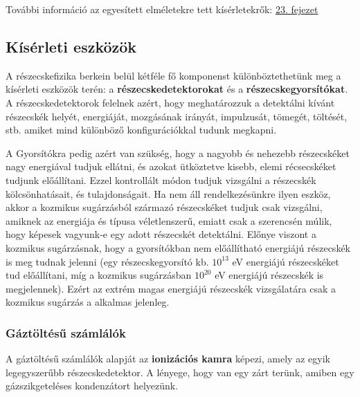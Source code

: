 \documentclass[../main.tex]{subfiles}
\begin{document}
További információ az egyesített elméletekre tett kísérletekrők: \href{http://fizweb.elte.hu/download/Fizika-BSc/Mag-es-reszecskefizika/Jegyzet/Horvath_Kiss-Kiserleti_atomfizika.pdf#%5B%7B%22num%22%3A1637%2C%22gen%22%3A0%7D%2C%7B%22name%22%3A%22FitH%22%7D%2C678%5D}{23. fejezet}



\subsection{Kísérleti eszközök}
A részecskefizika berkein belül kétféle fő komponenst különböztethetünk meg a kísérleti eszközök terén: a \textbf{részecskedetektorokat} és a \textbf{részecskegyorsítókat}.
A részecskedetektorok felelnek azért, hogy meghatározzuk a detektálni kívánt részecskék helyét, energiáját, mozgásának irányát, impulzusát, tömegét, töltését, stb. amiket mind különböző
konfigurációkkal tudunk megkapni.

A Gyorsítókra pedig azért van szükség, hogy a nagyobb és nehezebb részecskéket nagy energiával tudjuk ellátni, és azokat ütköztetve kisebb, elemi récsecskéket tudjunk előállítani. Ezzel kontrollált módon
tudjuk vizsgálni a részecskék kölcsönhatásait, és tulajdonságait. Ha nem áll rendelkezésünkre ilyen eszköz, akkor a kozmikus sugárzásból származó részecskéket tudjuk csak vizsgálni, amiknek az energiája és típusa véletlenszerű,
emiatt csak a szerencsén múlik, hogy képesek vagyunk-e egy adott részecskét detektálni. Előnye viszont a kozmikus sugárzásnak, hogy a gyorsítókban nem előállítható energiájú részecskék is meg tudnak jelenni
(egy részecskegyorsító kb. $10^{13}$ eV energiájú részecskéket tud előállítani, míg a kozmikus sugárzásban $10^{20}$ eV energiájú részecskék is megjelennek). Ezért az extrém magas energiájú részecskék vizsgálatára csak a kozmikus sugárzás a alkalmas jelenleg.

\subsubsection{Gáztöltésű számlálók}
A gáztöltésű számlálók alapját az \textbf{ionizációs kamra} képezi, amely az egyik legegyszerűbb részecskedetektor. A lényege, hogy van egy zárt terünk, amiben egy gázszikgeteléses kondenzátort helyezünk.
\end{document}
